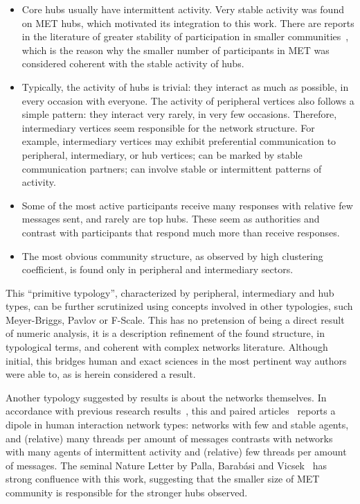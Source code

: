 \documentclass[%
 aip,
 jmp,%
 amsmath,amssymb,
 reprint,%
]{revtex4-1}
\begin{document}
\begin{itemize}
    \item Core hubs usually have intermittent activity. Very stable activity was found on MET hubs, which motivated its integration to this work. There are reports in the literature of greater stability of participation in smaller communities~\cite{barabasiEvo}, which is the reason why the smaller number of participants in MET was considered coherent with the stable activity of hubs.
    \item Typically, the activity of hubs is trivial: they interact as much as possible, in every occasion with everyone. The activity of peripheral vertices also follows a simple pattern: they interact very rarely, in very few occasions. Therefore, intermediary vertices seem responsible for the network structure. For example, intermediary vertices may exhibit preferential communication to peripheral, intermediary, or hub vertices; can be marked by stable communication partners; can involve stable or intermittent patterns of activity.
    \item Some of the most active participants receive many responses with relative few messages sent, and rarely are top hubs. These seem as authorities and contrast with participants that respond much more than receive responses.
    \item The most obvious community structure, as observed by high clustering coefficient, is found only in peripheral and intermediary sectors.
\end{itemize}


This ``primitive typology'', characterized by peripheral, intermediary and hub types, can be further scrutinized using concepts involved in other typologies, such Meyer-Briggs, Pavlov or F-Scale. This has no pretension of being a direct result of numeric analysis, it is a description refinement of the found structure, in typological terms, and coherent with complex networks literature. Although initial, this bridges human and exact sciences in the most pertinent way authors were able to, as is herein considered a result.

Another typology suggested by results is about the networks themselves. In accordance with previous research results~\cite{barabasiEvo}, this and paired articles~\cite{rcText,versinus} reports a dipole in human interaction network types: networks with few and stable agents, and (relative) many threads per amount of messages contrasts with networks with many agents of intermittent activity and (relative) few threads per amount of messages.
The seminal Nature Letter by Palla, Barab{\'a}si and Vicsek~\cite{barabasiEvo} has strong confluence with this work, suggesting that the smaller size of MET community is responsible for the stronger hubs observed.
\end{document}
